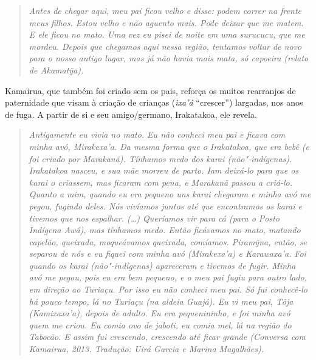 \begin{quote}
\emph{Antes de chegar aqui, meu pai ficou velho e disse: podem correr
na frente meus filhos. Estou velho e não aguento mais. Pode deixar que
me matem. E ele ficou no mato. Uma vez eu pisei de noite em uma
surucucu, que me mordeu. Depois que chegamos aqui nessa região, tentamos
voltar de novo para o nosso antigo lugar, mas já não havia mais mata, só
capoeira (relato de Akamatỹa).}
\end{quote}

Kamairua, que também foi criado sem os pais, reforça os muitos
rearranjos de paternidade que visam à criação de crianças (\emph{ixa'á}
``crescer'') largadas, nos anos de fuga. A partir de si e seu
amigo/germano, Irakatakoa, ele revela.

\begin{quote}
\emph{Antigamente eu vivia no mato. Eu não conheci meu pai e ficava
com minha avó, Mirakexa'a. Da mesma forma que o Irakatakoa, que era bebê
(e foi criado por Marakanã). Tínhamos medo dos karai (não"-indígenas).
Irakatakoa nasceu, e sua mãe morreu de parto. Iam deixá-lo para que os
karai o criassem, mas ficaram com pena, e Marakanã passou a criá-lo.
Quanto a mim, quando eu era pequeno uns karai chegaram e minha avó me
pegou, fugindo deles. Nós vivíamos juntos até que encontramos os karai e
tivemos que nos espalhar. (\ldots{}) Queríamos vir para cá (para o Posto
Indígena Awá), mas tínhamos medo. Então ficávamos no mato, matando
capelão, queixada, moqueávamos queixada, comíamos. Piramỹna, então, se
separou de nós e eu fiquei com minha avó (Mirakexa'a) e Karawaxa'a. Foi
quando os karai (não"-indígenas) apareceram e tivemos de fugir. Minha avó
me pegou, pois eu era bem pequeno, e o meu pai fugiu para outro lado, em
direção ao Turiaçu. Por isso eu não conheci meu pai. Só fui conhecê-lo
há pouco tempo, lá no Turiaçu (na aldeia Guajá). Eu vi meu pai, Tõja
(Kamixaxa'a), depois de adulto. Eu era pequenininho, e foi minha avó
quem me criou. Eu comia ovo de jaboti, eu comia mel, lá na região do
Tabocão. E assim fui crescendo, crescendo até ficar grande (Conversa
com Kamairua, 2013. Tradução: Uirá Garcia e Marina Magalhães).}
\end{quote}

